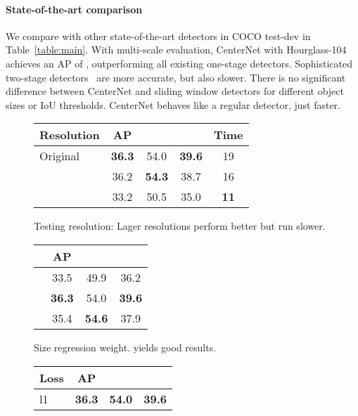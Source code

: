 \documentclass[10pt,twocolumn,letterpaper]{article}
\begin{document}
\paragraph{State-of-the-art comparison}
We compare with other state-of-the-art detectors in COCO test-dev in Table~\ref{table:main}.
With multi-scale evaluation, CenterNet with Hourglass-104 achieves an AP of , outperforming all existing one-stage detectors.
Sophisticated two-stage detectors~\cite{zhu2018deformable,sniper2018,liu2018path,li2019scale} are more accurate, but also slower.
There is no significant difference between CenterNet and sliding window detectors for different object sizes or IoU thresholds.
CenterNet behaves like a regular detector, just faster.

\begin{table*}[t]
\setlength{\tabcolsep}{1.4pt}
\begin{subfigure}[t]{0.28\linewidth}
\centering
\begin{tabular}{l c c c c}
\hline
Resolution & AP &  &  & Time \\
\hline
Original & \textbf{36.3} & 54.0 & \textbf{39.6} & 19 \\
& 36.2 & \textbf{54.3} & 38.7 & 16 \\
 & 33.2 & 50.5 & 35.0 & \textbf{11} \\
\hline
\end{tabular}
\caption{Testing resolution: Lager resolutions perform better but run slower.} \label{tab:design:resolution}
\end{subfigure}
\hspace{2mm}
\begin{subfigure}[t]{0.23\linewidth}
\centering
\begin{tabular}{l c c c}
\hline
 & AP &  &  \\
\hline
 & 33.5 & 49.9 & 36.2\\
 & \textbf{36.3} & 54.0 & \textbf{39.6} \\
 & 35.4 & \textbf{54.6} & 37.9 \\
\hline
\end{tabular}
\caption{Size regression weight.  yields good results.}
\label{tab:design:lossweight}
\end{subfigure}
\hspace{2mm}
\begin{subfigure}[t]{0.23\linewidth}
\centering
\begin{tabular}{l c c c}
\hline
Loss & AP &  &  \\
\hline
l1 & \textbf{36.3} & \textbf{54.0} & \textbf{39.6} \\

\end{tabular}
\end{subfigure}
\end{table*}
\end{document}
